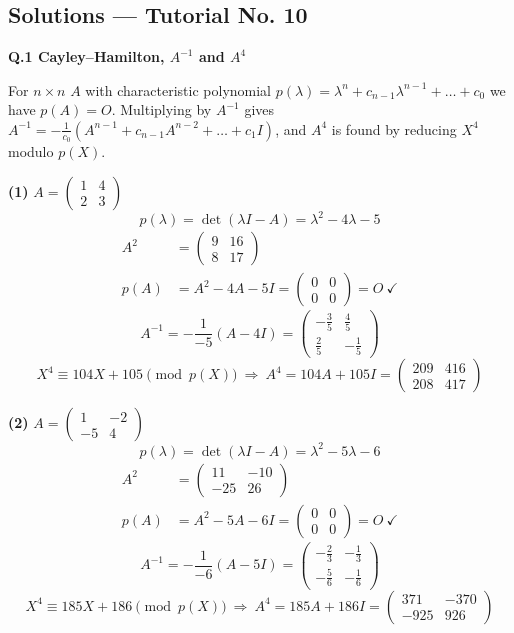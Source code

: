 \subsection*{Solutions --- Tutorial No. 10}
\medskip\noindent\textbf{Q.1  Cayley--Hamilton, $A^{-1}$ and $A^4$}\par\smallskip
For $n\times n$ $A$ with characteristic polynomial $p(\lambda)=\lambda^n+c_{n-1}\lambda^{n-1}+\dots+c_0$ we have $p(A)=O$. Multiplying by $A^{-1}$ gives $A^{-1}=-\frac{1}{c_0}(A^{n-1}+c_{n-1}A^{n-2}+\dots+c_1I)$, and $A^4$ is found by reducing $X^4$ modulo $p(X)$.

\noindent\textbf{(1)} $A=\begin{pmatrix}1 & 4 \\ 2 & 3\end{pmatrix}$
\[ p(\lambda)=\det(\lambda I-A)=\lambda^{2} - 4 \lambda - 5 \]
\begin{align*}
A^2&=\begin{pmatrix}9 & 16 \\ 8 & 17\end{pmatrix} \\
p(A)&=A^{2} - 4A - 5I=\begin{pmatrix}0 & 0 \\ 0 & 0\end{pmatrix}=O\ \checkmark
\end{align*}
\[ A^{-1}=-\frac{1}{-5}\left(A -4I\right)=\begin{pmatrix}- \frac{3}{5} & \frac{4}{5} \\ \frac{2}{5} & - \frac{1}{5}\end{pmatrix} \]
\[ X^4\equiv 104 X + 105\pmod{p(X)}\ \Rightarrow\ A^4=104A + 105I=\begin{pmatrix}209 & 416 \\ 208 & 417\end{pmatrix} \]

\noindent\textbf{(2)} $A=\begin{pmatrix}1 & -2 \\ -5 & 4\end{pmatrix}$
\[ p(\lambda)=\det(\lambda I-A)=\lambda^{2} - 5 \lambda - 6 \]
\begin{align*}
A^2&=\begin{pmatrix}11 & -10 \\ -25 & 26\end{pmatrix} \\
p(A)&=A^{2} - 5A - 6I=\begin{pmatrix}0 & 0 \\ 0 & 0\end{pmatrix}=O\ \checkmark
\end{align*}
\[ A^{-1}=-\frac{1}{-6}\left(A -5I\right)=\begin{pmatrix}- \frac{2}{3} & - \frac{1}{3} \\ - \frac{5}{6} & - \frac{1}{6}\end{pmatrix} \]
\[ X^4\equiv 185 X + 186\pmod{p(X)}\ \Rightarrow\ A^4=185A + 186I=\begin{pmatrix}371 & -370 \\ -925 & 926\end{pmatrix} \]

